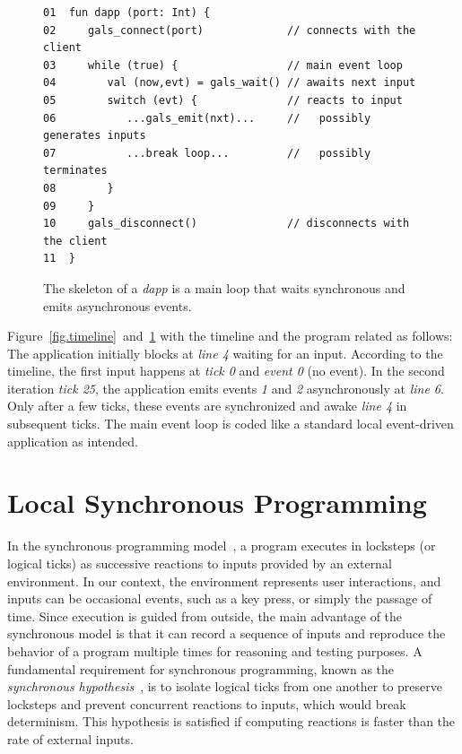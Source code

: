 \documentclass[sigplan,screen]{acmart}
\begin{document}
\begin{figure}[t]
{\scriptsize
\begin{verbatim}
01  fun dapp (port: Int) {
02     gals_connect(port)             // connects with the client
03     while (true) {                 // main event loop
04        val (now,evt) = gals_wait() // awaits next input
05        switch (evt) {              // reacts to input
06           ...gals_emit(nxt)...     //   possibly generates inputs
07           ...break loop...         //   possibly terminates
08        }
09     }
10     gals_disconnect()              // disconnects with the client
11  }
\end{verbatim}
}
  \caption{
    \label{fig.skel}
    The skeleton of a \emph{dapp} is a main loop that waits synchronous and
    emits asynchronous events.
  }
\end{figure}

Figure~\ref{fig.timeline}~and~\ref{fig.skel} with the timeline and the program
related as follows:
The application initially blocks at \emph{line 4} waiting for an input.
According to the timeline, the first input happens at \emph{tick 0} and
\emph{event 0} (no event).
In the second iteration \emph{tick 25}, the application emits events \emph{1}
and \emph{2} asynchronously at \emph{line 6}.
Only after a few ticks, these events are synchronized and awake \emph{line 4}
in subsequent ticks.
The main event loop is coded like a standard local event-driven application as
intended.

\section{Local Synchronous Programming}
\label{sec.sync}

In the synchronous programming model~\cite{sync}, a program executes in
locksteps (or logical ticks) as successive reactions to inputs provided by an
external environment.
In our context, the environment represents user interactions, and inputs can be
occasional events, such as a key press, or simply the passage of time.
Since execution is guided from outside, the main advantage of the synchronous
model is that it can record a sequence of inputs and reproduce the behavior of
a program multiple times for reasoning and testing purposes.
A fundamental requirement for synchronous programming, known as the
\emph{synchronous hypothesis}~\cite{hypo}, is to isolate logical ticks from one
another to preserve locksteps and prevent concurrent reactions to inputs, which
would break determinism.
This hypothesis is satisfied if computing reactions is faster than the rate of
external inputs.
\end{document}
